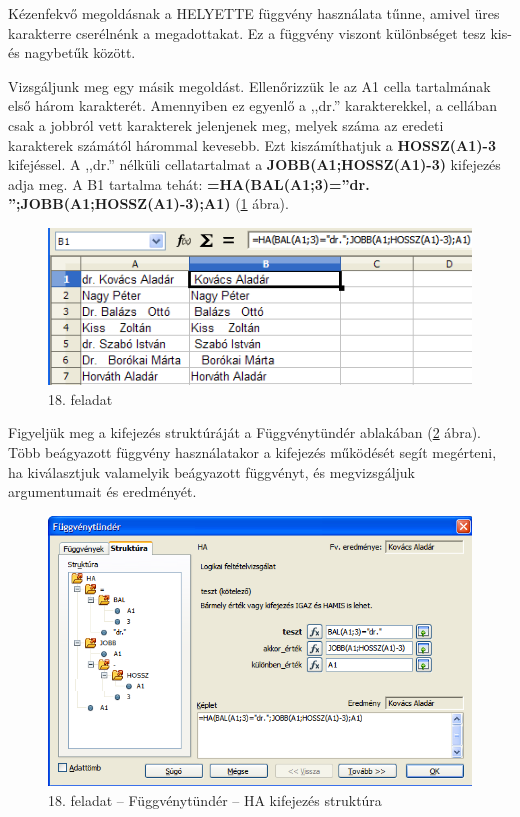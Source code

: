Kézenfekvő megoldásnak a HELYETTE függvény használata
tűnne, amivel üres karakterre cserélnénk a megadottakat. Ez a
függvény viszont különbséget tesz kis- és nagybetűk
között.

Vizsgáljunk meg egy másik megoldást. Ellenőrizzük le az A1
cella tartalmának első három karakterét. Amennyiben ez
egyenlő a ,,dr.'' karakterekkel, a
cellában csak a jobbról vett karakterek jelenjenek meg, melyek
száma az eredeti karakterek számától hárommal kevesebb. Ezt
kiszámíthatjuk a \textsf{\textbf{HOSSZ(A1)-3}} kifejéssel. A
,,dr.'' nélküli cellatartalmat a
\textsf{\textbf{JOBB(A1;HOSSZ(A1)-3)}} kifejezés adja meg. A B1
tartalma tehát:
\textsf{\textbf{=HA(BAL(A1;3)=''dr. '';JOBB(A1;HOSSZ(A1)-3);A1)}}
(\ref{18-feladat} ábra).

\begin{figure}[!h]
\begin{center}
\includegraphics[width=11.354cm]{oocalcv2-img90.png}
\caption{18. feladat}\label{18-feladat}
\end{center}
\end{figure}

Figyeljük meg a kifejezés struktúráját a
Függvénytündér ablakában (\ref{18-feladatIF} ábra). Több beágyazott
függvény használatakor a kifejezés működését segít
megérteni, ha kiválasztjuk valamelyik beágyazott függvényt,
és megvizsgáljuk argumentumait és eredményét.

\begin{figure}[!h]
\begin{center}
\includegraphics[width=15.999cm]{oocalcv2-img91.png}
\caption{18. feladat --  Függvénytündér -- HA kifejezés struktúra}\label{18-feladatIF}
\end{center}
\end{figure}

